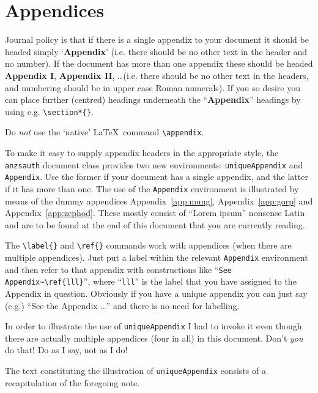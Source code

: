 \documentclass[times, doublespace]{anzsauth}
\begin{document}
\section{Appendices}
\label{sec:append}

Journal policy is that if there is a single appendix to your document
it should be headed simply `\textbf{Appendix}' (i.e. there should
be no other text in the header and no number).  If the document
has more than one appendix these should be headed \textbf{Appendix
I}, \textbf{Appendix II}, \ldots (i.e. there should be no
other text in the headers, and numbering should be in upper case
Roman numerals).  If you so desire you can place further (centred)
headings underneath the ``\textbf{Appendix}'' headings by using e.g.
\verb!\section*{}!.

Do \emph{not} use the `native' \LaTeX\ command \verb!\appendix!.

To make it easy to supply appendix headers in the appropriate style,
the \texttt{anzsauth} document class provides two new environments:
\texttt{uniqueAppendix} and \texttt{Appendix}.  Use the former
if your document has a single appendix, and the latter if it has
more than one.  The use of the \texttt{Appendix} environment is
illustrated by means of the dummy appendices Appendix~\ref{app:mung},
Appendix~\ref{app:gorp} and Appendix~\ref{app:zephod}.  These mostly
consist of ``Lorem ipsum'' nonsense Latin and are to be found at
the end of this document that you are currently reading.

The \verb!\label{}! and \verb!\ref{}! commands work with appendices
(when there are multiple appendices).  Just put a label within
the relevant \texttt{Appendix} environment and then refer to that
appendix with constructions like ``\verb!See Appendix~\ref{lll}!'',
where ``\verb!lll!'' is the label that you have assigned to the
Appendix in question.  Obviously if you have a unique appendix
you can just say (e.g.) ``See the Appendix \ldots'' and there
is no need for labelling.

In order to illustrate the use of \texttt{uniqueAppendix} I had to
invoke it even though there are actually multiple appendices (four
in all) in this document.  Don't \emph{you} do that!  Do as I say,
not as I do!

The text constituting the illustration of \texttt{uniqueAppendix}
consists of a recapitulation of the foregoing note.
\end{document}

